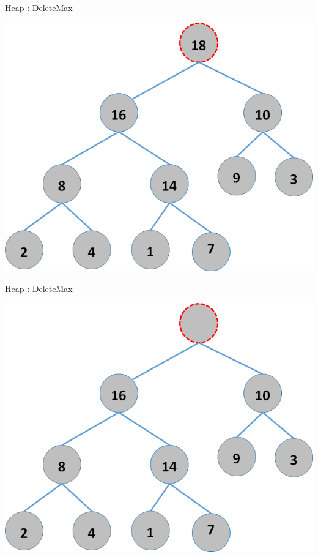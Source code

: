 \documentclass{beamer}
\begin{document}
\begin{frame}{Heap : DeleteMax}
    \begin{center}
        \includegraphics[scale=0.5]{heapDelete1.png}
    \end{center}
\end{frame}


\begin{frame}{Heap : DeleteMax}
    \begin{center}
        \includegraphics[scale=0.5]{heapDelete2.png}
    \end{center}
\end{frame}
\end{document}
